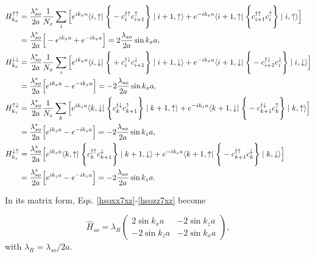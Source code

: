 \documentclass[10pt,prb,showpacs,amssymb,floatfix]{revtex4-1}
\newcommand{\nn}{\nonumber}
\newcommand{\lam}{\lambda}
\begin{document}
\begin{align}
\label{hsoxx7xz}
H_{k_x}^{\uparrow \uparrow} &=  \frac{\lambda_{so}^*}{2a} \frac{1}{N_x}\sum_{i} \Big{[} e^{i k_x a} \langle i,\uparrow \mid   \Bigg{\{}  - c_{i}^{\dagger \uparrow} c_{i+1}^\uparrow  \Bigg{\}} \mid i+1,\uparrow\rangle + e^{-i k_x a} \langle i+1,\uparrow \mid   \Bigg{\{} c_{i+1}^{\dagger \uparrow} c_{i}^\uparrow   \Bigg{\}} \mid i,\uparrow\rangle \Big{]} \nn\\
&= \frac{\lambda_{so}^*}{2a} \Big{[} -e^{i k_x a} + e^{-i k_x a} \Big{]}  = 2\frac{\lambda_{so}}{2a} \sin k_xa, \\
H_{k_x}^{\downarrow \downarrow} &=  \frac{\lambda_{so}^*}{2a} \frac{1}{N_x}\sum_{i} \Big{[} e^{i k_x a} \langle i,\downarrow \mid   \Bigg{\{}  + c_{i}^{\dagger \downarrow} c_{i+1}^\downarrow \Bigg{\}} \mid i+1,\downarrow\rangle + e^{-i k_x a} \langle i+1,\downarrow\mid   \Bigg{\{}   - c_{i+1}^{\dagger \downarrow} c_{i}^\downarrow \Bigg{\}} \mid i,\downarrow\rangle \Big{]} \nn\\
&=  \frac{\lambda_{so}^*}{2a} \Big{[} e^{i k_x a}  - e^{-i k_x a} \Big{]} = - 2 \frac{\lambda_{so}}{2a} \sin k_xa, \\
H_{k_z}^{\uparrow \downarrow} &=  \frac{\lambda_{so}^*}{2a} \frac{1}{N_z}\sum_{k} \Big{[} e^{i k_z a} \langle k,\downarrow  \mid \Bigg{\{}  c_{k}^{\dagger \downarrow} c_{k+1}^\uparrow  \Bigg{\}} \mid k+1,\uparrow\rangle + e^{-i k_z a} \langle k+1,\downarrow \mid  \Bigg{\{} -c_{k+1}^{\dagger \downarrow} c_{k}^\uparrow  \Bigg{\}} \mid k,\uparrow\rangle \Big{]} \nn\\
&= \frac{\lambda_{so}^*}{2a} \Big{[} e^{i k_z a} - e^{-i k_z a} \Big{]} = -2\frac{\lambda_{so}}{2a} \sin k_za, \\
H_{k_z}^{\downarrow \uparrow} &=  \frac{\lambda_{so}^*}{2a} \Big{[} e^{i k_z a} \langle k,\uparrow  \mid \Bigg{\{}    c_{k}^{\dagger \uparrow} c_{k+1}^\downarrow \Bigg{\}} \mid k+1,\downarrow\rangle + e^{-i k_z a} \langle k+1,\uparrow \mid  \Bigg{\{}  - c_{k+1}^{\dagger \uparrow} c_{k}^\downarrow  \Bigg{\}} \mid k,\downarrow\rangle \Big{]}  \nn\\
&=  \frac{\lambda_{so}^*}{2a} \Big{[} e^{i k_z a} - e^{-i k_z a}  \Big{]}  = -2\frac{\lambda_{so}}{2a} \sin k_z a.
\label{hsozz7xz}
\end{align}

In its matrix form, Eqs. \eqref{hsoxx7xz}-\eqref{hsozz7xz} become

\begin{equation}
\hat H_{so} =  \lambda_{R} \left(\begin{array}{cc} 
2\sin k_xa  &  -2\sin k_za\\
-2\sin k_za &  -2\sin k_xa
\end{array}\right),
\label{matso}
\end{equation}
 with $\lam_R=\lam_{so}/2a$.
 
\end{document}
